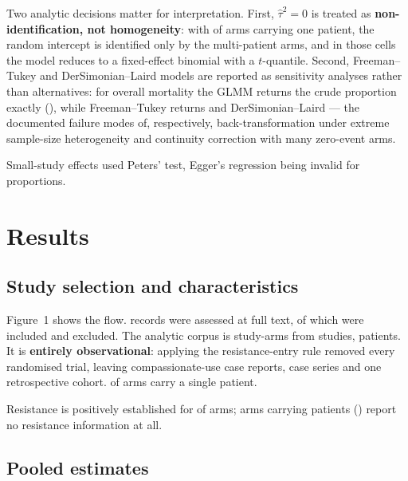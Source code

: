 \documentclass[12pt]{article}
\begin{document}
Two analytic decisions matter for interpretation. First, $\hat\tau^2=0$ is treated as \textbf{non-identification, not homogeneity}: with \SingleArmShare of arms carrying one patient, the random intercept is identified only by the multi-patient arms, and in those cells the model reduces to a fixed-effect binomial with a $t$-quantile. Second, Freeman--Tukey and DerSimonian--Laird models are reported as sensitivity analyses rather than alternatives: for overall mortality the GLMM returns the crude proportion exactly (\MortOverallEst), while Freeman--Tukey returns \MortOverallFT{} and DerSimonian--Laird \MortOverallDL{} --- the documented failure modes of, respectively, back-transformation under extreme sample-size heterogeneity \parencite{Schwarzer2019_doublearcsine} and continuity correction with many zero-event arms.

Small-study effects used Peters' test, Egger's regression being invalid for proportions.

\section{Results}

\subsection*{Study selection and characteristics}

Figure~1 shows the flow. \PrismaAssessed records were assessed at full text, of which \PrismaIncludedStudies were included and \PrismaExcluded excluded. The analytic corpus is \ArmsAnalysed study-arms from \StudiesAnalysed studies, \PatientsAnalysed patients. It is \textbf{entirely observational}: applying the resistance-entry rule removed every randomised trial, leaving compassionate-use case reports, case series and one retrospective cohort. \SingleArmShare of arms carry a single patient.

Resistance is positively established for \ResClassifiedArms of \ArmsAnalysed arms; \ResNotClassifiableArms arms carrying \ResNotClassifiablePatients patients (\ResNotClassifiablePct) report no resistance information at all.

\subsection*{Pooled estimates}
\end{document}
